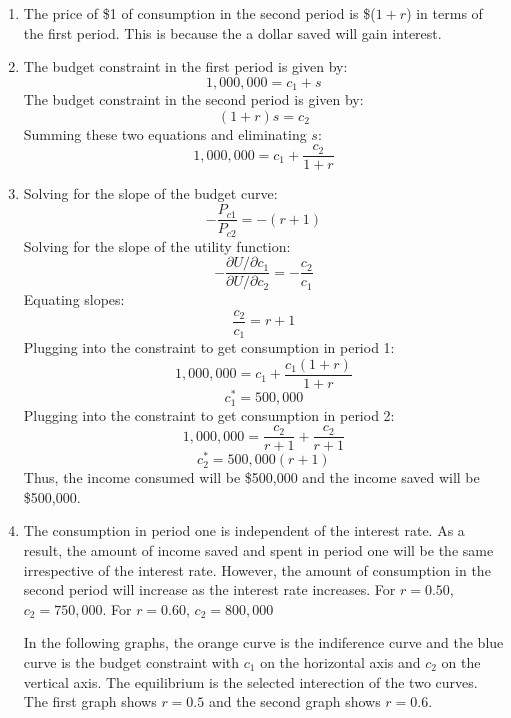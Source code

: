 \documentclass{article}
\begin{document}
\begin{enumerate}
    \item The price of \$1 of consumption in the second period is \$($1+r$) in
        terms of the first period. This is because the a dollar saved will gain
        interest.
    \item The budget constraint in the first period is given by:
        $$1,000,000 = c_1 + s$$
        The budget constraint in the second period is given by:
        $$(1 + r)s = c_2$$
        Summing these two equations and eliminating $s$:
        $$1,000,000 = c_1 + \frac{c_2}{1 + r}$$
    \item Solving for the slope of the budget curve:
        $$-\frac{P_{c1}}{P_{c2}} = -(r+1)$$
        Solving for the slope of the utility function:
        $$-\frac{\partial U / \partial c_1}{\partial U / \partial c_2} = -
        \frac{c_2}{c_1}$$
        Equating slopes: 
        $$\frac{c_2}{c_1} = r+1$$
        Plugging into the constraint to get consumption in period 1:
        $$1,000,000 = c_1 + \frac{c_1(1+r)}{1+r}$$
        $$c_1^* = 500,000$$
        Plugging into the constraint to get consumption in period 2:
        $$1,000,000 = \frac{c_2}{r+1} + \frac{c_2}{r+1}$$
        $$c_2^* = 500,000(r+1)$$
        Thus, the income consumed will be \$500,000 and the income saved will be
        \$500,000.
    \item The consumption in period one is independent of the interest rate. As
        a result, the amount of income saved and spent in period one will be the
        same irrespective of the interest rate. However, the amount of
        consumption in the second period will increase as the interest rate
        increases. For $r=0.50$, $c_2=750,000$. For $r=0.60$, $c_2=800,000$

        In the following graphs, the orange curve is the indiference curve and
        the blue curve is the budget constraint with $c_1$ on the horizontal
        axis and $c_2$ on the vertical axis. The equilibrium is the selected
        interection of the two curves. The first graph shows $r=0.5$ and the
        second graph shows $r=0.6$.


\end{enumerate}
\end{document}
